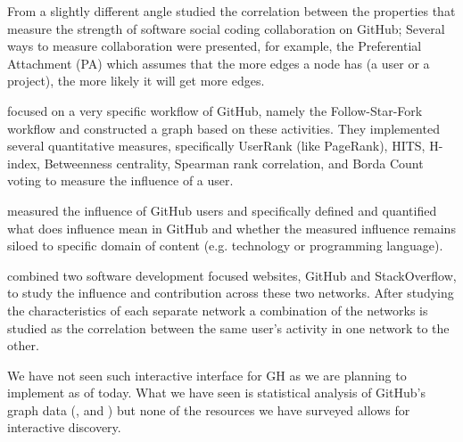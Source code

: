 \documentclass[sigconf,11pt]{acmart}
\begin{document}
From a slightly different angle \citeauthor{collaboration-strength-metrics-github} \cite{collaboration-strength-metrics-github}
studied the correlation between the properties that measure the strength of software social coding
collaboration on GitHub; Several ways to measure collaboration were presented, for example,
the Preferential Attachment (PA) which assumes that the more edges a node has (a user or a project),
the more likely it will get more edges.

\citeauthor{user-influence-analysis-github} \cite{user-influence-analysis-github} focused on a very specific
workflow of GitHub, namely the Follow-Star-Fork workflow and constructed a graph based on these activities.
They implemented several quantitative measures, specifically UserRank (like PageRank), HITS, H-index\cite{wiki:h-index},
Betweenness centrality\cite{betweenness}, Spearman rank correlation\cite{wiki:spearman},
and Borda Count voting\cite{wiki:borda} to measure the influence of a user.

\citeauthor{measuring-user-influence-github} \cite{measuring-user-influence-github} measured the influence
of GitHub users and specifically defined and quantified what does influence mean in GitHub and whether the measured
influence remains siloed to specific domain of content (e.g. technology or programming language).

\citeauthor{influence-github-stackoverflow} \cite{influence-github-stackoverflow} combined two software development
focused websites, GitHub and StackOverflow, to study the influence and contribution across these two networks.
After studying the characteristics of each separate network a combination of the networks is studied
as the correlation between the same user's activity in one network to the other.


We have not seen such interactive interface for GH as we are planning to implement as of today.
What we have seen is statistical analysis of GitHub's graph data (\cite{coding-together},
\cite{influence-analysis-of-github-repositories} and \cite{collaboration-strength-metrics-github})
but none of the resources we have surveyed allows for interactive discovery.
\end{document}

